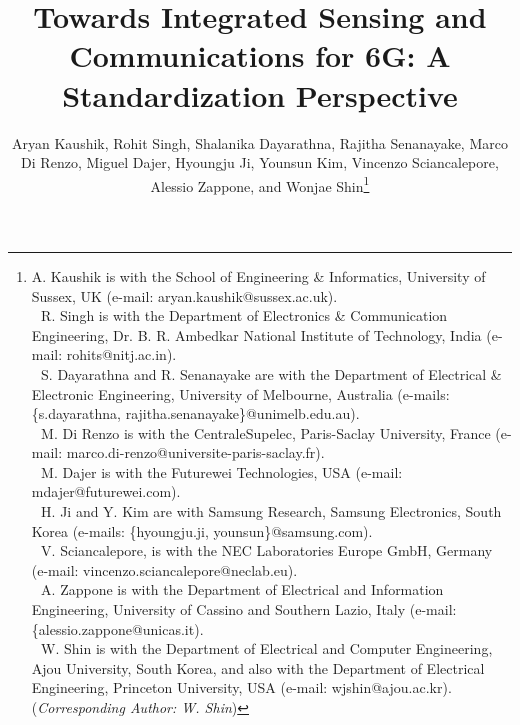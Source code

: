 \documentclass[journal, comsoc]{IEEEtran}
\begin{document}
%
\title{Towards Integrated Sensing and Communications for 6G: A Standardization Perspective}
%
%
%

\author{Aryan Kaushik, Rohit Singh, Shalanika Dayarathna, Rajitha Senanayake‬, Marco Di Renzo, Miguel Dajer, Hyoungju Ji, Younsun Kim, Vincenzo Sciancalepore, Alessio Zappone, and  Wonjae Shin\thanks{A. Kaushik is with the School of Engineering \& Informatics, University	of Sussex, UK (e-mail: aryan.kaushik@sussex.ac.uk). \\$~~~$R. Singh is with the Department of Electronics \& Communication Engineering, Dr. B. R. Ambedkar National Institute of Technology, India (e-mail: rohits@nitj.ac.in). \\$~~~$S. Dayarathna and R. Senanayake are with the Department of Electrical \& Electronic Engineering, University of Melbourne, Australia (e-mails: \{s.dayarathna, rajitha.senanayake\}@unimelb.edu.au). \\$~~~$M. Di Renzo is with the CentraleSupelec, Paris-Saclay University, France (e-mail: marco.di-renzo@universite-paris-saclay.fr). \\$~~~$M. Dajer is with the Futurewei Technologies, USA (e-mail: mdajer@futurewei.com). \\$~~~$H. Ji and Y. Kim are with Samsung Research, Samsung Electronics, South Korea (e-mails: \{hyoungju.ji, younsun\}@samsung.com).\\$~~~$V. Sciancalepore, is with the NEC Laboratories Europe GmbH, Germany (e-mail: vincenzo.sciancalepore@neclab.eu). \\$~~~$A. Zappone is with the Department of Electrical and Information Engineering, University of Cassino and Southern Lazio, Italy (e-mail: \{alessio.zappone@unicas.it).  \\ $~~~$W. Shin is with the Department of Electrical and Computer Engineering, Ajou University, South Korea, and also with the Department of Electrical Engineering, Princeton University, USA (e-mail: wjshin@ajou.ac.kr). (\textit{Corresponding Author: W. Shin})
}}%
\end{document}
